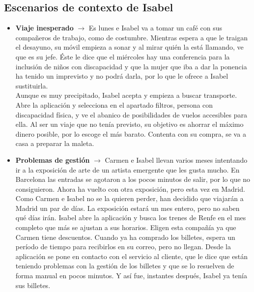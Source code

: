 \subsection{Escenarios de contexto de Isabel}
\begin{itemize}
    \item \textbf{Viaje inesperado} $\rightarrow$ Es lunes e Isabel va a tomar un café con sus compañeros de trabajo, como de costumbre. Mientras espera a 
    que le traigan el desayuno, su móvil empieza a sonar y al mirar quién la está llamando, ve que es su jefe. Éste le dice que el miércoles hay una conferencia 
    para la inclusión de niños con discapacidad y que la mujer que iba a dar la ponencia ha tenido un imprevisto y no podrá darla, por lo que le ofrece a Isabel 
    sustituirla.\\
    Aunque es muy precipitado, Isabel acepta y empieza a buscar transporte. Abre la aplicación y selecciona en el apartado filtros, persona con discapacidad 
    física, y ve el abanico de posibilidades de vuelos accesibles para ella. Al ser un viaje que no tenía previsto, su objetivo es ahorrar el máximo dinero 
    posible, por lo escoge el más barato. Contenta con su compra, se va a casa a preparar la maleta.
    \item \textbf{Problemas de gestión} $\rightarrow$ Carmen e Isabel llevan varios meses intentando ir a la exposición de arte de un artista emergente que les 
    gusta mucho. En Barcelona las entradas se agotaron a los pocos minutos de salir, por lo que no consiguieron. Ahora ha vuelto con otra exposición, pero esta 
    vez en Madrid. \\
    Como Carmen e Isabel no se la quieren perder, han decidido que viajarán a Madrid un par de días. La exposición estará un mes entero, pero no saben qué días irán.
    Isabel abre la aplicación y busca los trenes de Renfe en el mes completo que más se ajustan a sus horarios. Eligen esta compañía ya que Carmen tiene 
    descuentos. Cuando ya ha comprado los billetes, espera un período de tiempo para recibirlos en su correo, pero no llegan. Desde la aplicación se pone en contacto 
    con el servicio al cliente, que le dice que están teniendo problemas con la gestión de los billetes y que se lo resuelven de forma manual en pocos minutos. Y así 
    fue, instantes después, Isabel ya tenía sus billetes.
\end{itemize}

